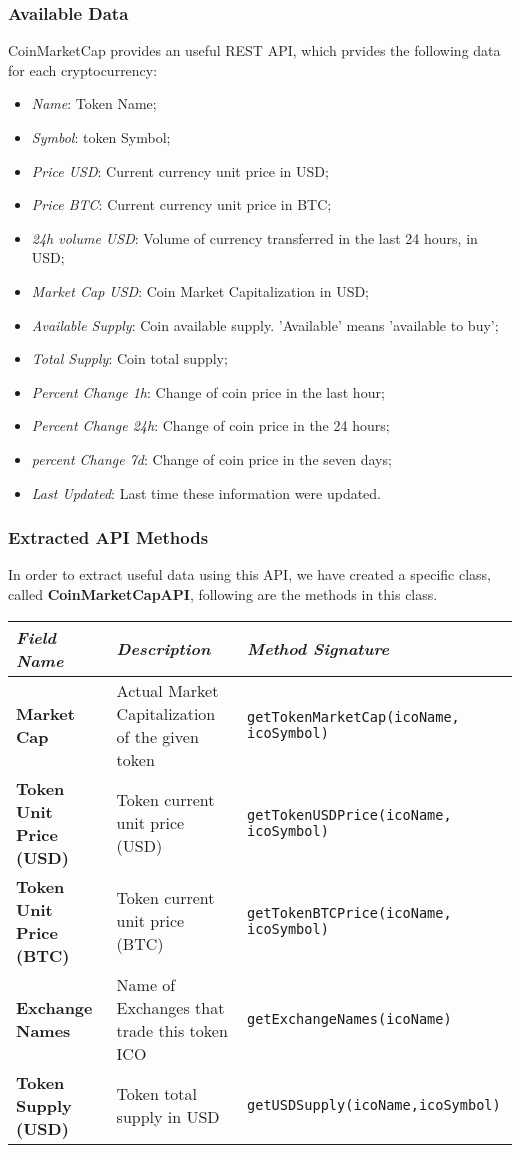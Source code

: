 \subsubsection{Available Data}
CoinMarketCap provides an useful REST API, which prvides the following data for each cryptocurrency:
\begin{itemize}
    \item \textit{Name}: Token Name;
    \item \textit{Symbol}: token Symbol;
    \item \textit{Price USD}: Current currency unit price in USD;
    \item \textit{Price BTC}: Current currency unit price in BTC;
    \item \textit{24h volume USD}: Volume of currency transferred in the last 24 hours, in USD;
    \item \textit{Market Cap USD}: Coin Market Capitalization in USD;
    \item \textit{Available Supply}: Coin available supply. 'Available' means 'available to buy';
    \item \textit{Total Supply}: Coin total supply;
    \item \textit{Percent Change 1h}: Change of coin price in the last hour;
    \item \textit{Percent Change 24h}: Change of coin price in the 24 hours;
    \item \textit{percent Change 7d}: Change of coin price in the seven days;
    \item \textit{Last Updated}: Last time these information were updated.
\end{itemize}
\subsubsection{Extracted API Methods}
In order to extract useful data using this API, we have created a specific class, called \textbf{CoinMarketCapAPI}, following are the methods in this class.
\begin{center}
\begin{tabular}{| C{2cm} | C{4cm} | C{7cm} |} \hline
    \textit{Field Name} & \textit{Description} & \textit{Method Signature}\\ \hline 
    \textbf{Market Cap} & Actual Market Capitalization of the given token &
    \texttt{getTokenMarketCap(icoName, icoSymbol)}\\ \hline
    \textbf{Token Unit Price (USD)} & Token current unit price (USD) &
    \texttt{getTokenUSDPrice(icoName, icoSymbol)}\\ \hline
    \textbf{Token Unit Price (BTC)} & Token current unit price (BTC) &
    \texttt{getTokenBTCPrice(icoName, icoSymbol)}\\ \hline 
    \textbf{Exchange Names} & Name of Exchanges that trade this token ICO &
    \texttt{getExchangeNames(icoName)}\\ \hline 
    \textbf{Token Supply (USD)} & Token total supply in USD &
    \texttt{getUSDSupply(icoName,icoSymbol)}\\ \hline
\end{tabular}
\end{center}

